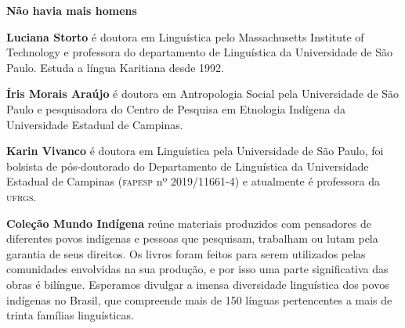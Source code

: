 \textbf{Não havia mais homens} \lipsum[1]

\textbf{Luciana Storto} é doutora em Linguística pelo Massachusetts Institute of
Technology e professora do departamento de Linguística da Universidade
de São Paulo. Estuda a língua Karitiana desde 1992.

\textbf{Íris Morais Araújo} é doutora em Antropologia Social pela Universidade de
São Paulo e pesquisadora do Centro de Pesquisa em Etnologia Indígena da
Universidade Estadual de Campinas.

\textbf{Karin Vivanco} é doutora em Linguística pela Universidade de São Paulo,
foi bolsista de pós-doutorado do Departamento de Linguística da
Universidade Estadual de Campinas (\textsc{fapesp} nº 2019/11661-4) e atualmente
é professora da \textsc{ufrgs}.

\textbf{Coleção Mundo Indígena} reúne materiais produzidos com pensadores de diferentes povos indígenas e pessoas que pesquisam, trabalham ou lutam pela garantia de seus direitos. Os livros foram feitos para serem utilizados pelas comunidades envolvidas na sua produção, e por isso uma parte significativa das obras é bilíngue. Esperamos divulgar a imensa diversidade linguística dos povos indígenas no Brasil, que compreende mais de 150 línguas pertencentes a mais de trinta famílias linguísticas.




